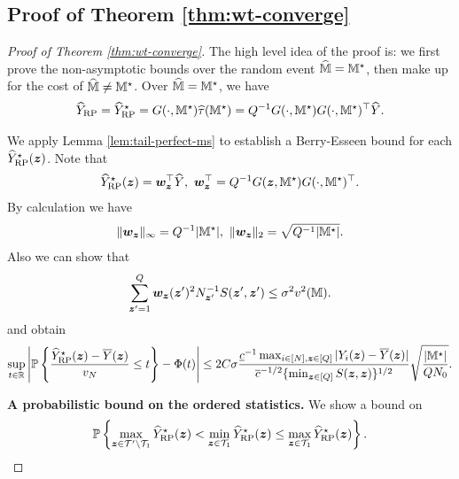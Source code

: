 \documentclass[12pt]{article}
\begin{document}
\subsection{Proof of Theorem \ref{thm:wt-converge}}
\begin{proof}[Proof of Theorem \ref{thm:wt-converge}]
The high level idea of the proof is: we first prove the non-asymptotic bounds over the random event $\widehat{{\mathbb{M}}} = {\mathbb{M}}^\star$, then make up for the cost of $\widehat{{\mathbb{M}}} \neq {\mathbb{M}}^\star$. Over $\widehat{{\mathbb{M}}} = {\mathbb{M}}^\star$, we have 
\begin{align*}
    \widehat{Y}_{\operatorname{RP}} = \widehat{Y}^\star_{\operatorname{RP}} = G(\cdot,{{\mathbb{M}}^\star}) {\widehat{\tau}}({\mathbb{M}}^\star) = Q^{-1}G(\cdot,{{\mathbb{M}}^\star})G(\cdot,{{\mathbb{M}}^\star})^\top {\widehat{Y}}.
\end{align*}

We apply Lemma \ref{lem:tail-perfect-ms} to establish a Berry-Esseen bound for each ${\widehat{Y}}^\star_{\operatorname{RP}}({\boldsymbol{z}})$. Note that
\begin{align}\label{eqn:hY-RP-star}
    {\widehat{Y}}^\star_{\operatorname{RP}}({\boldsymbol{z}}) = {\boldsymbol{w}}_{{\boldsymbol{z}}}^\top {\widehat{Y}}, ~{\boldsymbol{w}}_{{\boldsymbol{z}}}^\top = Q^{-1}G({\boldsymbol{z}}, {\mathbb{M}}^\star) G(\cdot,{\mathbb{M}}^\star)^\top.
\end{align}
By calculation we have
\begin{align*}
    \|{\boldsymbol{w}}_{{\boldsymbol{z}}}\|_\infty = Q^{-1}|{\mathbb{M}}^\star|, ~\|{\boldsymbol{w}}_{{\boldsymbol{z}}}\|_2 = \sqrt{Q^{-1} |{\mathbb{M}}^\star|}.
\end{align*}
Also we can show that
\begin{align*}
    \sum_{{\boldsymbol{z}}'=1}^Q  {{\boldsymbol{w}}}_{{\boldsymbol{z}}}({\boldsymbol{z}}')^2 N_{{\boldsymbol{z}}'}^{-1} S({\boldsymbol{z}}',{\boldsymbol{z}}') \le \sigma^2 v^2({\mathbb{M}}).
\end{align*}
and obtain
\begin{align}\label{eqn:BE-marginal-t}
  \sup_{t\in{\mathbb{R}}} \left|{\mathbb{P}}\left\{\frac{{\widehat{Y}}^\star_{\operatorname{RP}}({\boldsymbol{z}}) - \overline{Y}({\boldsymbol{z}})}{v_N}\le t\right\} - \Phi(t)\right| \le 2C\sigma   \frac{ \underline{c}^{-1} \max_{i\in[N],{\boldsymbol{z}}\in[Q]}|Y_i({\boldsymbol{z}})-\overline{Y}({\boldsymbol{z}})|}{ {\overline{c}^{-1/2} \{\min_{{\boldsymbol{z}}\in[Q]} S({\boldsymbol{z}},{\boldsymbol{z}})}\}^{1/2}} \sqrt{\frac{|{\mathbb{M}}^\star|}{QN_0}}.
\end{align}


   \textbf{A probabilistic bound on the ordered statistics.} We show a bound on
\begin{align*}
    {\mathbb{P}}\left\{\max_{{\boldsymbol{z}} \in  {\mathcal{T}}'\backslash{\mathcal{T}}_{1}}{\widehat{Y}}^\star_{\operatorname{RP}}({\boldsymbol{z}}) <\min_{{\boldsymbol{z}}\in{\mathcal{T}}_{1}}{\widehat{Y}}^\star_{\operatorname{RP}}({\boldsymbol{z}}) \le \max_{{\boldsymbol{z}}\in{\mathcal{T}}_{1}}{\widehat{Y}}^\star_{\operatorname{RP}}({\boldsymbol{z}})\right\}.
\end{align*}




\end{proof}
\end{document}
